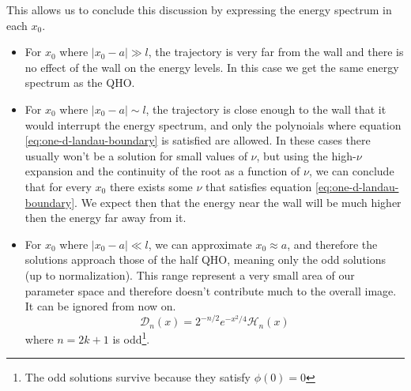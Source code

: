 \documentclass{article}
\begin{document}
This allows us to conclude this discussion by expressing the energy spectrum in each $x_0$.
\begin{itemize}
    \item For $x_0$ where $|x_0 - a| \gg l$, the trajectory is very far from the wall and there is no effect of the wall on the energy levels. In this case we get the same energy spectrum as the QHO.
    \item For $x_0$ where $|x_0 - a| \sim l$, the trajectory is close enough to the wall that it would interrupt the energy spectrum, and only the polynoials where equation \ref{eq:one-d-landau-boundary} is satisfied are allowed. In these cases there usually won't be a solution for small values of $\nu$, but using the high-$\nu$ expansion and the continuity of the root as a function of $\nu$, we can conclude that for every $x_0$ there exists some $\nu$ that satisfies equation \ref{eq:one-d-landau-boundary}. We expect then that the energy near the wall will be much higher then the energy far away from it.
    \item For $x_0$ where $|x_0 - a| \ll l$, we can approximate $x_0 \approx a$, and therefore the solutions approach those of the half QHO, meaning only the odd solutions (up to normalization). This range represent a very small area of our parameter space and therefore doesn't contribute much to the overall image. It can be ignored from now on.
    \begin{equation}
        \mathcal{D}_n(x) = 2^{-n/2}e^{-x^2/4}\mathcal{H}_n(x)
    \end{equation}
    where $n = 2k+1$ is odd\footnote{The odd solutions survive because they satisfy $\phi(0) = 0$}.
\end{itemize}
\end{document}
